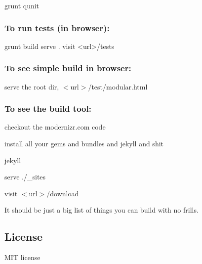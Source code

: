 \begin{DoxyCode}
grunt qunit
\end{DoxyCode}


\subsubsection*{To run tests (in browser)\+:}


\begin{DoxyCode}
grunt build
serve .
visit <url>/tests
\end{DoxyCode}


\subsubsection*{To see simple build in browser\+:}

serve the root dir, {\ttfamily $<$url$>$/test/modular.html}

\subsubsection*{To see the build tool\+:}


\begin{DoxyItemize}
\item checkout the modernizr.\+com code
\item install all your gems and bundles and jekyll and shit
\item {\ttfamily jekyll}
\item {\ttfamily serve ./\+\_\+sites}
\item visit $<$url$>$/download
\item It should be just a big list of things you can build with no frills.
\end{DoxyItemize}

\subsection*{License}

M\+IT license 
